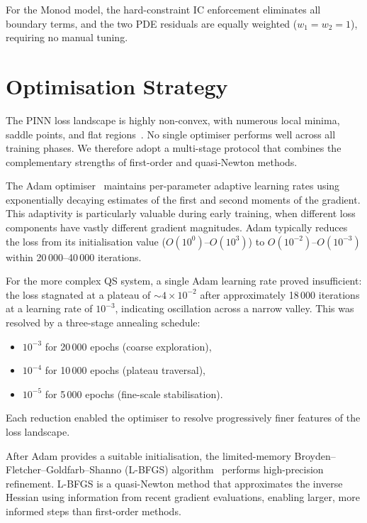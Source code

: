 \documentclass[14pt,a4paper,openany]{extbook}
\begin{document}
For the Monod model, the hard-constraint IC enforcement eliminates all
boundary terms, and the two PDE residuals are equally weighted
($w_1 = w_2 = 1$), requiring no manual tuning.

\section{Optimisation Strategy}
\label{sec:optimization}

The PINN loss landscape is highly non-convex, with numerous local minima,
saddle points, and flat regions~\cite{wang2021understanding}.  No single
optimiser performs well across all training phases.  We therefore adopt a
multi-stage protocol that combines the complementary strengths of first-order
and quasi-Newton methods.

The Adam optimiser~\cite{kingma2015adam} maintains per-parameter adaptive
learning rates using exponentially decaying estimates of the first and
second moments of the gradient.  This adaptivity is particularly valuable
during early training, when different loss components have vastly different
gradient magnitudes.  Adam typically reduces the loss from its
initialisation value ($O(10^{0})$--$O(10^{3})$) to
$O(10^{-2})$--$O(10^{-3})$ within 20\,000--40\,000 iterations.

For the more complex QS system, a single Adam learning rate proved
insufficient: the loss stagnated at a plateau of
$\sim\!4 \times 10^{-2}$ after approximately 18\,000 iterations at a
learning rate of $10^{-3}$, indicating oscillation across a narrow valley.
This was resolved by a three-stage annealing schedule:
%
\begin{itemize}
    \item $10^{-3}$ for 20\,000 epochs (coarse exploration),
    \item $10^{-4}$ for 10\,000 epochs (plateau traversal),
    \item $10^{-5}$ for 5\,000 epochs (fine-scale stabilisation).
\end{itemize}
%
Each reduction enabled the optimiser to resolve progressively finer
features of the loss landscape.

After Adam provides a suitable initialisation, the limited-memory
Broyden--Fletcher--Goldfarb--Shanno (L-BFGS)
algorithm~\cite{liu1989limited} performs high-precision refinement.  L-BFGS
is a quasi-Newton method that approximates the inverse Hessian using
information from recent gradient evaluations, enabling larger, more informed
steps than first-order methods.
\end{document}
